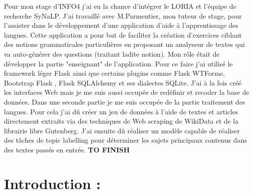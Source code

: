 \documentclass[12pt]{article}
\begin{document}
Pour mon stage d’INFO4 j’ai eu la chance d’intégrer le LORIA et l’équipe de recherche SyNaLP. J’ai travaillé avec M.Parmentier, mon tuteur de stage, pour l’assister dans le développement d’une application d’aide à l’apprentissage des langues. Cette application a pour but de faciliter la création d’exercices ciblant des notions grammaticales particulières en proposant un analyseur de textes qui va auto-générer des questions (traitant ladite notion). 
Mon rôle était de développer la partie "enseignant" de l’application. Pour ce faire j’ai utilisé le framework léger Flask ainsi que certains plugins comme Flask WTForms, Bootstrap Flask , Flask SQLAlchemy et ses dialectes SQLite. J’ai à la fois créé les interfaces Web mais je me suis aussi occupée de redéfinir et recoder la base de données. 
Dans une seconde partie je me suis occupée de la partie traitement des langues. Pour cela j'ai dû créer un jeu de données à l'aide de textes et articles directement extraits via des techniques de Web scraping de WikiData et de la librairie libre Gutenberg. J'ai ensuite dû réaliser un modèle capable de réaliser des tâches de topic labelling pour déterminer les sujets principaux contenus dans des textes passés en entrée. 
 \textbf{TO FINISH}

\newpage

\tableofcontents

\listoffigures

\newpage

\section{Introduction :}
\end{document}
